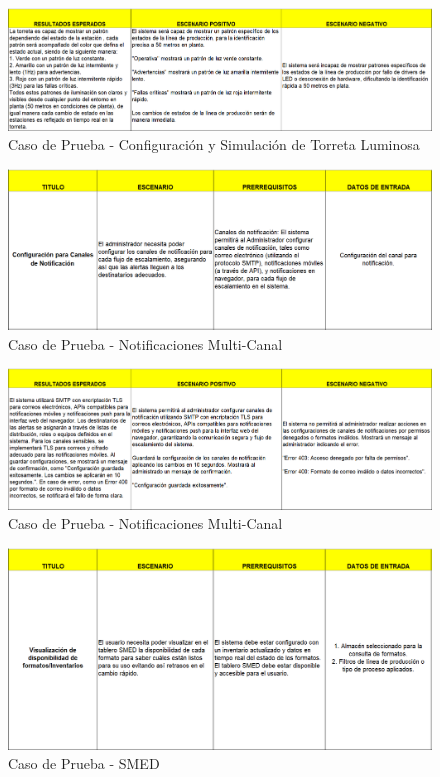 \documentclass[12pt,letterpaper,spanish, xcolor=table]{report}
\numberwithin{figure}{subsection}
\begin{document}
	\begin{figure}[H]
		\centering
		\includegraphics[width=1.0\textwidth]
		{Imagenes/PathAyuda/CPTorreta2.png}
		\caption{Caso de Prueba - Configuración y Simulación de Torreta Luminosa
		}\label{a2}
	\end{figure}
	
	\begin{figure}[H]
		\centering
		\includegraphics[width=1.0\textwidth]
		{Imagenes/PathAyuda/CPMultiCanal.png}
		\caption{Caso de Prueba - Notificaciones Multi-Canal
		}\label{a2}
	\end{figure}
	
	\begin{figure}[H]
		\centering
		\includegraphics[width=1.0\textwidth]
		{Imagenes/PathAyuda/CPMultiCanal2.png}
		\caption{Caso de Prueba - Notificaciones Multi-Canal
		}\label{a2}
	\end{figure}
	
	\begin{figure}[H]
		\centering
		\includegraphics[width=1.0\textwidth]
		{Imagenes/PathAyuda/CPSMED.png}
		\caption{Caso de Prueba - SMED
		}\label{a2}
	\end{figure}
	
\end{document}
